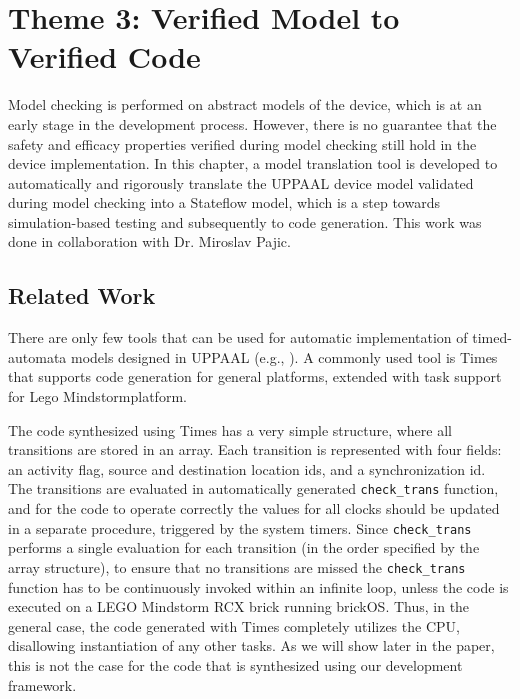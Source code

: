 \chapter{Theme 3: Verified Model to Verified Code}
Model checking is performed on abstract models of the device, which is at an early stage in the development process. 
However, there is no guarantee that the safety and efficacy properties verified during model checking still hold in the device implementation.
In this chapter, a model translation tool is developed to automatically and rigorously translate the UPPAAL device model validated during model checking into a Stateflow model, which is a step towards simulation-based testing and subsequently to code generation. 
This work was done in collaboration with Dr. Miroslav Pajic.

\section{Related Work}
\label{sec:code_gen}
There are only few tools that can be used for automatic implementation of timed-automata models designed in UPPAAL (e.g., \cite{times,up2nqc}). A commonly used tool is Times~\cite{times} that supports code generation for general platforms, extended with task support for {Lego Mindstorm}\texttrademark  platform. 

The code synthesized using Times has a very simple structure, where all transitions are stored in an array. Each transition is represented with four fields: an activity flag, source and destination location ids, and a synchronization id. The transitions are evaluated in automatically generated \texttt{check\_trans} function, and for the code to operate correctly the values for all clocks should be updated in a separate procedure, triggered by the system timers. Since \texttt{check\_trans} performs a single evaluation for each transition (in the order specified by the array structure), to ensure that no transitions are missed the \texttt{check\_trans} function has to be continuously invoked within an infinite loop, unless the code is executed on a LEGO Mindstorm RCX brick running brickOS. Thus, in the general case, the code generated with Times completely utilizes the CPU, disallowing instantiation of any other tasks. As we will show later in the paper, this is not the case for the code that is synthesized using our development framework.

